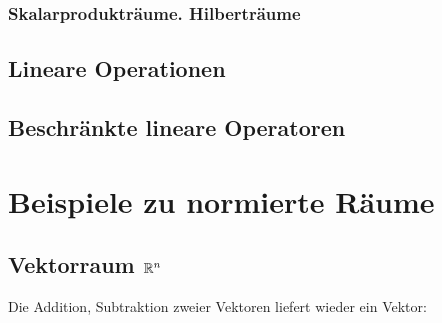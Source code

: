 \documentclass[letterpaper,10pt,english]{jupyterBook}
\begin{document}
\subsection{Skalarprodukträume. Hilberträume}
\label{\detokenize{Funktionalanalysis/Funktionalanalysis:skalarproduktraume-hilbertraume}}

\section{Lineare Operationen}
\label{\detokenize{Funktionalanalysis/Funktionalanalysis:lineare-operationen}}

\section{Beschränkte lineare Operatoren}
\label{\detokenize{Funktionalanalysis/Funktionalanalysis:beschrankte-lineare-operatoren}}

\chapter{Beispiele zu normierte Räume}
\label{\detokenize{Funktionalanalysis/Beispiele:beispiele-zu-normierte-raume}}\label{\detokenize{Funktionalanalysis/Beispiele::doc}}

\section{Vektorraum \protect\(\mathbb{R}^n\protect\)}
\label{\detokenize{Funktionalanalysis/Beispiele:vektorraum-mathbb-r-n}}
\begin{sphinxVerbatim}[commandchars=\\\{\}]
   
\end{sphinxVerbatim}

\begin{sphinxVerbatim}[commandchars=\\\{\}]
  \PYG{p}{[}\PYG{p}{]}
  \PYG{p}{[}    \PYG{p}{]}
\end{sphinxVerbatim}

Die Addition, Subtraktion zweier Vektoren liefert wieder ein Vektor:
\end{document}
